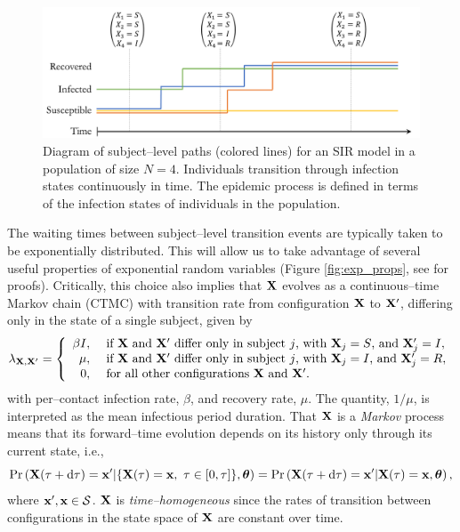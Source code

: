 \begin{figure}[htbp]
	\centering
	\includegraphics[width=0.8\linewidth]{figures/subject_sample_paths}
	\caption[Diagram of subject--level SIR paths.]{Diagram of subject--level paths (colored lines) for an SIR model in a population of size $ N=4 $. Individuals transition through infection states continuously in time. The epidemic process is defined in terms of the infection states of individuals in the population.}
	\label{fig:subjectsamplepaths}
\end{figure}

The waiting times between subject--level transition events are typically taken to be exponentially distributed. This will allow us to take advantage of several useful properties of exponential random variables (Figure \ref{fig:exp_props}, see \cite{wilkinson2011stochastic} for proofs). Critically, this choice also implies that $ \mathbf{X} $ evolves as a continuous--time Markov chain (CTMC) with transition rate from configuration $ \mathbf{X} $ to $ \mathbf{X}^\prime $, differing only in the state of a single subject, given by
\begin{equation}
\lambda_{\mathbf{X},\mathbf{X}^\prime} = \left \lbrace \begin{array}{rl}
\beta I,\ &\text{if } \mathbf{X}\ \text{and } \mathbf{X}^\prime\ \text{differ only in subject }j \text{, with }\mathbf{X}_j=S\text{, and }\mathbf{X}_j^\prime=I,\\
\mu,\ &\text{if } \mathbf{X}\ \text{and } \mathbf{X}^\prime\ \text{differ only in subject }j \text{, with }\mathbf{X}_j=I\text{, and }\mathbf{X}_j^\prime=R,\\
0,\ & \text{for all other configurations }\mathbf{X}\ \text{and }\mathbf{X}^\prime.
\end{array}\right.
\end{equation}
with per--contact infection rate,  $ \beta $, and recovery rate, $ \mu $. The quantity, $ 1/\mu $, is interpreted as the mean infectious period duration. That $ \mathbf{X} $ is a \textit{Markov} process means that its forward--time evolution depends on its history only through its current state, i.e.,
\begin{equation}
\label{eqn:sir_markov}
\Pr\left (\bX(\tau + \dtau) = \bx^\prime | \lbrace\bX(\tau) = \bx,\ \tau\in[0,\tau]\rbrace, \btheta\right ) = \Pr\left (\bX(\tau + \dtau) = \bx^\prime | \bX(\tau) = \bx,\btheta\right ),
\end{equation}
where $ \mathbf{x}^\prime,\mathbf{x} \in \mathcal{S}$. $ \mathbf{X} $ is \textit{time--homogeneous} since the rates of transition between configurations in the state space of $ \mathbf{X} $ are constant over time. 


